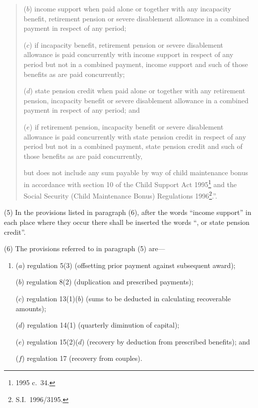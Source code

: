 \documentclass[12pt,a4paper]{article}
\begin{document}
\begin{enumerate}
\begin{enumerate}
\begin{quotation}
\begin{enumerate}
    ($b$) 
    income support when paid alone or together with any incapacity benefit, retirement pension or severe disablement allowance in a combined payment in respect of any period;

    ($c$) 
    if incapacity benefit, retirement pension or severe disablement allowance is paid concurrently with income support in respect of any period but not in a combined payment, income support and such of those benefits as are paid concurrently;

    ($d$) 
    state pension credit when paid alone or together with any retirement pension, incapacity benefit or severe disablement allowance in a combined payment in respect of any period; and

    ($e$) 
    if retirement pension, incapacity benefit or severe disablement allowance is paid concurrently with state pension credit in respect of any period but not in a combined payment, state pension credit and such of those benefits as are paid concurrently,
\end{enumerate}
    but does not include any sum payable by way of child maintenance bonus in accordance with section 10 of the Child Support Act 1995\footnote{1995 c.\ 34.} and the Social Security (Child Maintenance Bonus) Regulations 1996\footnote{S.I.\ 1996/3195.}.”. 
\end{quotation}
\end{enumerate}
\end{enumerate}

(5) In the provisions listed in paragraph (6), after the words “income support” in each place where they occur there shall be inserted the words “, or state pension credit”.

(6) The provisions referred to in paragraph (5) are—
\begin{enumerate}\item[]
($a$) regulation 5(3) (offsetting prior payment against subsequent award);

($b$) regulation 8(2) (duplication and prescribed payments);

($c$) regulation 13(1)($b$)  (sums to be deducted in calculating recoverable amounts);

($d$) regulation 14(1) (quarterly diminution of capital);

($e$) regulation 15(2)($d$)  (recovery by deduction from prescribed benefits); and

($f$) regulation 17 (recovery from couples).
\end{enumerate}
\end{document}
